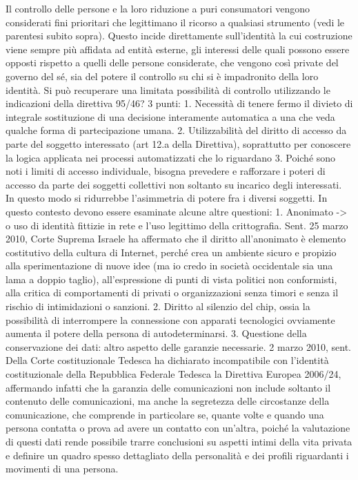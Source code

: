 Il controllo delle persone e la loro riduzione a puri consumatori vengono considerati fini prioritari che legittimano il ricorso a qualsiasi strumento (vedi le parentesi subito sopra). Questo incide direttamente sull’identità la cui costruzione viene sempre più affidata ad entità esterne, gli interessi delle quali possono essere opposti rispetto a quelli delle persone considerate, che vengono così private del governo del sé, sia del potere il controllo su chi si è impadronito della loro identità.
Si può recuperare una limitata possibilità di controllo utilizzando le indicazioni della direttiva 95/46? 3 punti:
1.	Necessità di tenere fermo il divieto di integrale sostituzione di una decisione interamente automatica a una che veda qualche forma di partecipazione umana.
2.	Utilizzabilità del diritto di accesso da parte del soggetto interessato (art 12.a della Direttiva), soprattutto per conoscere la logica applicata nei processi automatizzati che lo riguardano
3.	Poiché sono noti i limiti di accesso individuale, bisogna prevedere e rafforzare i poteri di accesso da parte dei soggetti collettivi non soltanto su incarico degli interessati. In questo modo si ridurrebbe l’asimmetria di potere fra i diversi soggetti.
In questo contesto devono essere esaminate alcune altre questioni:
1.	Anonimato -> o uso di identità fittizie in rete e l’uso legittimo della crittografia.
Sent. 25 marzo 2010, Corte Suprema Israele ha affermato che il diritto all’anonimato è elemento costitutivo della cultura di Internet, perché crea un ambiente sicuro e propizio alla sperimentazione di nuove idee (ma io credo in società occidentale sia una lama a doppio taglio), all’espressione di punti di vista politici non conformisti, alla critica di comportamenti di privati o organizzazioni senza timori e senza il rischio di intimidazioni o sanzioni. 
2.	Diritto al silenzio del chip, ossia la possibilità di interrompere la connessione con apparati tecnologici ovviamente aumenta il potere della persona di autodeterminarsi.
3.	Questione della conservazione dei dati: altro aspetto delle garanzie necessarie. 2 marzo 2010, sent. Della Corte costituzionale Tedesca ha dichiarato incompatibile con l’identità costituzionale della Repubblica Federale Tedesca la Direttiva Europea 2006/24, affermando infatti che la garanzia delle comunicazioni non include soltanto il contenuto delle comunicazioni, ma anche la segretezza delle circostanze della comunicazione, che comprende in particolare se, quante volte e quando una persona contatta o prova ad avere un contatto con un’altra, poiché la valutazione di questi dati rende possibile trarre conclusioni su aspetti intimi della vita privata e definire un quadro spesso dettagliato della personalità e dei profili riguardanti i movimenti di una persona. 
